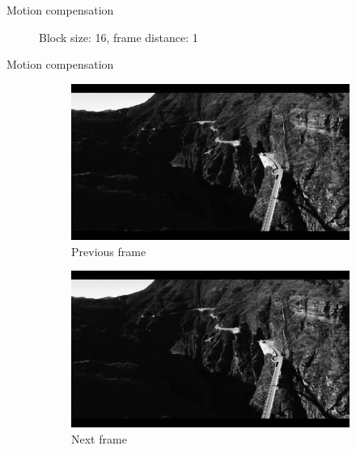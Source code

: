 \documentclass[aspectratio=1610,xcolor=dvipsnames]{beamer}
\begin{document}
\begin{frame}{Motion compensation}
\begin{figure}[htbp]
        \caption{Block size: 16, frame distance: 1}
    \end{figure}
\end{frame}

\begin{frame}{Motion compensation}
    \begin{figure}[htbp]
        \begin{subfigure}[b]{0.3\textwidth}
            \centering
            \includegraphics[width=\textwidth]{images/bird-previous.png}
            \caption{Previous frame}
            \label{fig:bird-prev-frame}
        \end{subfigure}
        \hfill
        \begin{subfigure}[b]{0.3\textwidth}
            \includegraphics[width=\textwidth]{images/bird-current.png}
            \caption{Next frame}
            \label{fig:bird-curr-frame}
        \end{subfigure}
        \hfill
        \begin{subfigure}[b]{0.3\textwidth}

\end{subfigure}
\end{figure}
\end{frame}
\end{document}
